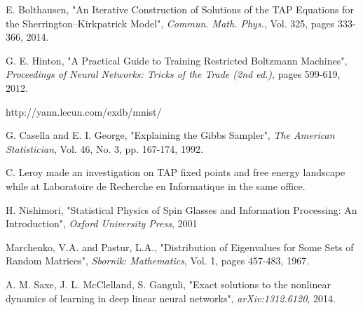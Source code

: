 \begin{thebibliography}{9}
E. Bolthausen, "An Iterative Construction of Solutions of the TAP Equations for the Sherrington–Kirkpatrick Model", \textit{Commun. Math. Phys.}, Vol. 325, pages 333-366, 2014.

G. E. Hinton, "A Practical Guide to Training Restricted Boltzmann Machines", \textit{Proceedings of Neural Networks: Tricks of the Trade (2nd ed.)}, pages 599-619, 2012. 

http://yann.lecun.com/exdb/mnist/

G. Casella and E. I. George, "Explaining the Gibbs Sampler",
\textit{The American Statistician},
Vol. 46, No. 3, pp. 167-174, 1992.

C. Leroy made an investigation on TAP fixed points and free energy landscape while at Laboratoire de Recherche en Informatique in the same office.

H. Nishimori, "Statistical Physics of Spin Glasses and Information Processing: An Introduction",
\textit{Oxford University Press}, 2001

Marchenko, V.A. and Pastur, L.A., "Distribution of Eigenvalues for Some Sets of Random Matrices", \textit{Sbornik: Mathematics}, Vol. 1, pages 457-483, 1967.

A. M. Saxe, J. L. McClelland, S. Ganguli, "Exact solutions to the nonlinear dynamics of learning in deep linear neural networks",
\textit{arXiv:1312.6120}, 2014.

\end{thebibliography}
